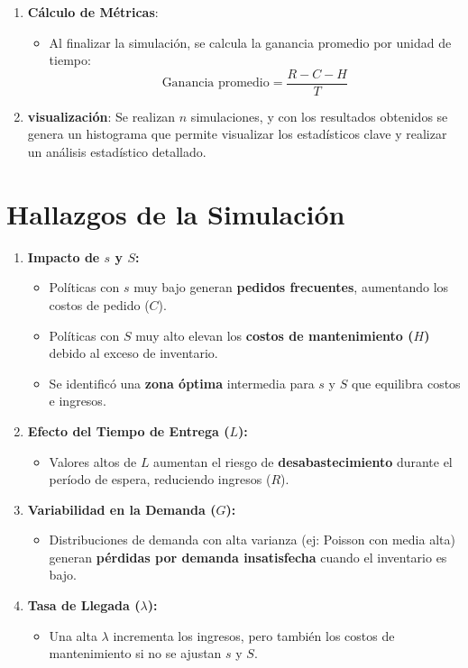 \documentclass[a4paper,12pt]{article}
\begin{document}
\begin{itemize}
\begin{enumerate}
    \item \textbf{Cálculo de Métricas}:
    \begin{itemize}
        \item Al finalizar la simulación, se calcula la ganancia promedio por unidad de tiempo:
        \[
        \text{Ganancia promedio} = \frac{R - C - H}{T}
        \]
    \end{itemize}
    \item \textbf{visualización}:
    Se realizan \( n \) simulaciones, y con los resultados obtenidos se genera un histograma que permite visualizar los estadísticos clave y realizar un análisis estadístico detallado.

\end{enumerate}

\end{itemize}
\section{Hallazgos de la Simulación}
\begin{enumerate}
    \item \textbf{Impacto de \( s \) y \( S \):}
    \begin{itemize}
        \item Políticas con \( s \) muy bajo generan \textbf{pedidos frecuentes}, aumentando los costos de pedido (\( C \)).
        \item Políticas con \( S \) muy alto elevan los \textbf{costos de mantenimiento (\( H \))} debido al exceso de inventario.
        \item Se identificó una \textbf{zona óptima} intermedia para \( s \) y \( S \) que equilibra costos e ingresos.
    \end{itemize}
    
    \item \textbf{Efecto del Tiempo de Entrega (\( L \)):}
    \begin{itemize}
        \item Valores altos de \( L \) aumentan el riesgo de \textbf{desabastecimiento} durante el período de espera, reduciendo ingresos (\( R \)).
    \end{itemize}
    
    \item \textbf{Variabilidad en la Demanda (\( G \)):}
    \begin{itemize}
        \item Distribuciones de demanda con alta varianza (ej: Poisson con media alta) generan \textbf{pérdidas por demanda insatisfecha} cuando el inventario es bajo.
    \end{itemize}
    
    \item \textbf{Tasa de Llegada (\( \lambda \)):}
    \begin{itemize}
        \item Una alta \( \lambda \) incrementa los ingresos, pero también los costos de mantenimiento si no se ajustan \( s \) y \( S \).
    \end{itemize}
\end{enumerate}
\end{document}
